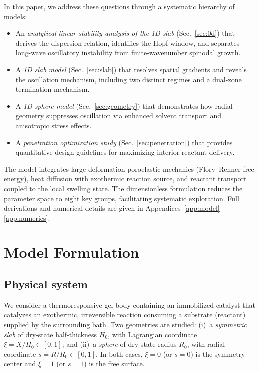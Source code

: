 \documentclass[aps,pre,reprint,superscriptaddress,longbibliography,floatfix]{revtex4-2}
\begin{document}
In this paper, we address these questions through a systematic hierarchy
of models:
\begin{itemize}
  \item An \emph{analytical linear-stability analysis of the 1D slab}
    (Sec.~\ref{sec:0d}) that derives the dispersion relation, identifies
    the Hopf window, and separates long-wave oscillatory instability
    from finite-wavenumber spinodal growth.
  \item A \emph{1D slab model} (Sec.~\ref{sec:slab}) that resolves
    spatial gradients and reveals the oscillation mechanism, including
    two distinct regimes and a dual-zone termination mechanism.
  \item A \emph{1D sphere model} (Sec.~\ref{sec:geometry}) that
    demonstrates how radial geometry suppresses oscillation via enhanced
    solvent transport and anisotropic stress effects.
  \item A \emph{penetration optimization study}
    (Sec.~\ref{sec:penetration}) that provides quantitative design
    guidelines for maximizing interior reactant delivery.
\end{itemize}

The model integrates large-deformation poroelastic mechanics
(Flory--Rehner free energy), heat diffusion with exothermic reaction
source, and reactant transport coupled to the local swelling state. The
dimensionless formulation reduces the parameter space to eight key
groups, facilitating systematic exploration. Full derivations and
numerical details are given in
Appendices~\ref{app:model}--\ref{app:numerics}.


\section{Model Formulation}
\label{sec:model}

\subsection{Physical system}

We consider a thermoresponsive gel body containing an immobilized
catalyst that catalyzes an exothermic, irreversible reaction consuming a
substrate (reactant) supplied by the surrounding bath. Two geometries are
studied: (i)~a \emph{symmetric slab} of dry-state half-thickness $H_0$,
with Lagrangian coordinate $\xi=X/H_0\in[0,1]$; and (ii)~a
\emph{sphere} of dry-state radius $R_0$, with radial coordinate
$s=R/R_0\in[0,1]$. In both cases, $\xi=0$ (or $s=0$) is the symmetry
center and $\xi=1$ (or $s=1$) is the free surface.
\end{document}
